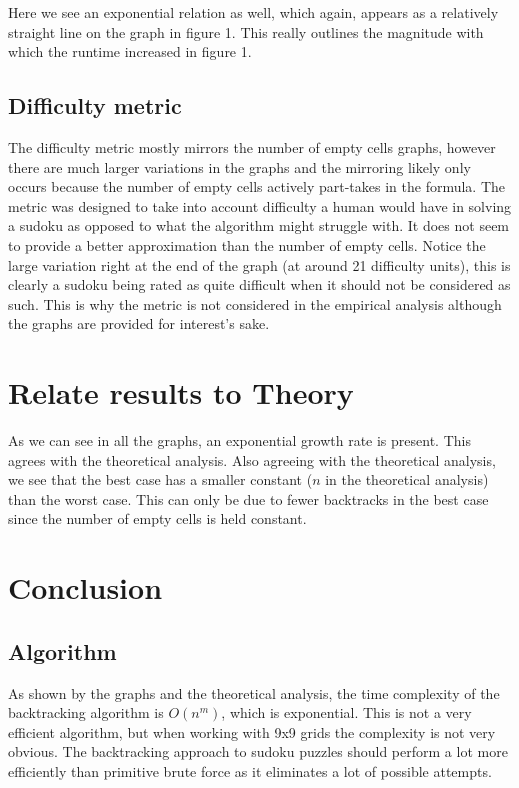 \documentclass{article}
\begin{document}
Here we see an exponential relation as well, which again, appears as a relatively straight line on the graph in figure 1. This really outlines the magnitude with which the runtime increased in figure 1.

\newpage

\subsection{Difficulty metric}
The difficulty metric mostly mirrors the number of empty cells graphs, however there are much larger variations in the graphs and the mirroring likely only occurs because the number of empty cells actively part-takes in the formula. The metric was designed to take into account difficulty a human would have in solving a sudoku as opposed to what the algorithm might struggle with. It does not seem to provide a better approximation than the number of empty cells. Notice the large variation right at the end of the graph (at around 21 difficulty units), this is clearly a sudoku being rated as quite difficult when it should not be considered as such. This is why the metric is not considered in the empirical analysis although the graphs are provided for interest's sake.

\section{Relate results to Theory}
As we can see in all the graphs, an exponential growth rate is present. This agrees with the theoretical analysis. Also agreeing with the theoretical analysis, we see that the best case has a smaller constant ($n$ in the theoretical analysis) than the worst case. This can only be due to fewer backtracks in the best case since the number of empty cells is held constant.

\section{Conclusion}
\subsection{Algorithm}
As shown by the graphs and the theoretical analysis, the time complexity of the backtracking algorithm is $O(n^m)$, which is exponential. This is not a very efficient algorithm, but when working with 9x9 grids the complexity is not very obvious. The backtracking approach to sudoku puzzles should perform a lot more efficiently than primitive brute force as it eliminates a lot of possible attempts.
\end{document}
